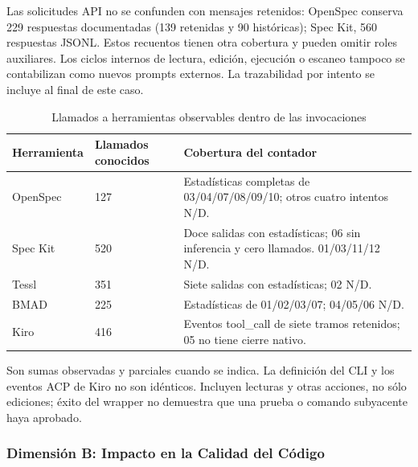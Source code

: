 Las solicitudes API no se confunden con mensajes retenidos: OpenSpec conserva 229 respuestas documentadas (139 retenidas y 90 históricas); Spec Kit, 560 respuestas JSONL. Estos recuentos tienen otra cobertura y pueden omitir roles auxiliares. Los ciclos internos de lectura, edición, ejecución o escaneo tampoco se contabilizan como nuevos prompts externos. La trazabilidad por intento se incluye al final de este caso.

\begin{table}[H]\centering\small\setlength{\tabcolsep}{4pt}\renewcommand{\arraystretch}{1.06}
\caption{Llamados a herramientas observables dentro de las invocaciones}
\label{tab:llamados_tetris_e2}
\begin{tabularx}{\textwidth}{l Y Y}\toprule

\textbf{Herramienta} & \textbf{Llamados conocidos} & \textbf{Cobertura del contador} \\ \midrule

OpenSpec & 127 & Estadísticas completas de 03/04/07/08/09/10; otros cuatro intentos N/D. \\

Spec Kit & 520 & Doce salidas con estadísticas; 06 sin inferencia y cero llamados. 01/03/11/12 N/D. \\

Tessl & 351 & Siete salidas con estadísticas; 02 N/D. \\

BMAD & 225 & Estadísticas de 01/02/03/07; 04/05/06 N/D. \\

Kiro & 416 & Eventos tool\_call de siete tramos retenidos; 05 no tiene cierre nativo. \\

\bottomrule\end{tabularx}

\par\smallskip\begin{minipage}{\textwidth}\footnotesize Son sumas observadas y parciales cuando se indica. La definición del CLI y los eventos ACP de Kiro no son idénticos. Incluyen lecturas y otras acciones, no sólo ediciones; éxito del wrapper no demuestra que una prueba o comando subyacente haya aprobado.\end{minipage}

\end{table}

\subsubsection{Dimensión B: Impacto en la Calidad del Código}

